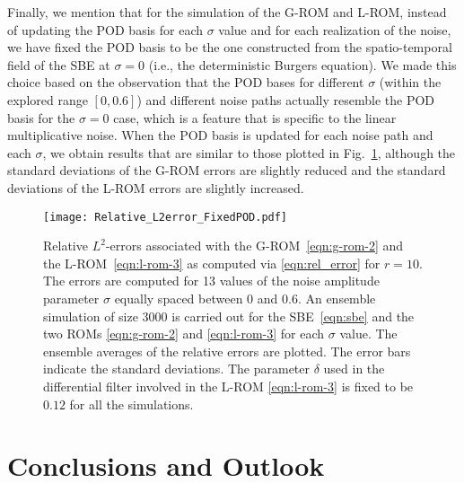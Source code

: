 \documentclass[11pt]{amsart}
\numberwithin{equation}{section}
\begin{document}
Finally, we mention that for the simulation of the G-ROM and L-ROM, instead of updating the POD basis for each $\sigma$ value and for each realization of the noise, we have fixed the POD basis to be the one constructed from the spatio-temporal field of the SBE at $\sigma=0$ (i.e., the deterministic Burgers equation). We made this choice based on the observation that the POD bases for different $\sigma$ (within the explored range $[0,0.6]$) and different noise paths actually resemble the POD basis for the $\sigma=0$ case, which is a feature that is specific to the linear multiplicative noise. When the POD basis is updated for each noise path and each $\sigma$,  we obtain results that are similar to those plotted in Fig.~\ref{fig:question-4-1}, although the standard deviations of the G-ROM errors are slightly reduced and the standard deviations of the L-ROM errors are slightly increased. 

\begin{figure}
\begin{center}
	\texttt{[image: Relative\_L2error\_FixedPOD.pdf]} %
	\caption{
		Relative $L^2$-errors associated with the G-ROM~\eqref{eqn:g-rom-2} and the L-ROM~\eqref{eqn:l-rom-3} as computed via \eqref{eqn:rel_error} for $r=10$. The errors are computed for 13 values of the noise amplitude parameter $\sigma$ equally spaced between $0$ and $0.6$. An ensemble simulation of size $3000$ is carried out for the SBE~\eqref{eqn:sbe} and the two ROMs \eqref{eqn:g-rom-2} and \eqref{eqn:l-rom-3} for each $\sigma$ value. The ensemble averages of the relative errors are plotted. The error bars indicate the standard deviations. The parameter $\delta$ used in the differential filter involved in the L-ROM \eqref{eqn:l-rom-3} is fixed to be $0.12$ for all the simulations. 
	}
	\label{fig:question-4-1} 
	\end{center}
\end{figure}


\section{Conclusions and Outlook}
	\label{sec:conclusions}
\end{document}

